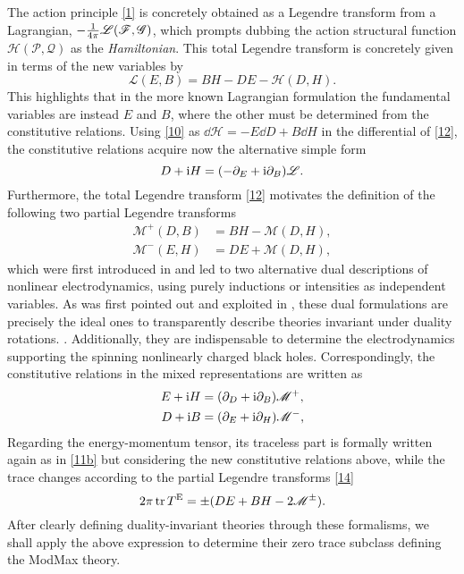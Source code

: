 The action principle \eqref{1} is concretely obtained as a Legendre transform from a Lagrangian, $-\frac{1}{4\pi }\mathscr{L}(\mathscr{F},\mathscr{G})$, which prompts dubbing the action structural function $\mathscr{H}(\mathscr{P},\mathscr{Q})$ as the \textit{Hamiltonian}. This total Legendre transform is concretely given in terms of the new variables by
\begin{equation}\label{12}
  \mathscr{L}(E,B)=BH-DE-\mathscr{H}(D,H).
\end{equation}
This highlights that in the more known Lagrangian formulation the fundamental variables are instead $E$ and $B$, where the other must be determined from the constitutive relations. Using \eqref{10} as $\dd\mathscr{H}=-E\dd D+B\dd H$ in the differential of \eqref{12}, the constitutive relations acquire now the alternative simple form
\begin{equation}\label{13}
  D+\mathrm{i} H=(-\partial_E+\mathrm{i} \partial_B)\mathscr{L}.
\end{equation}
Furthermore, the total Legendre transform \eqref{12} motivates the definition of the following two partial Legendre transforms
\begin{subequations}\label{14}
	\begin{align}
  \mathscr{M}^+(D,B)&=BH-\mathscr{M}(D,H),\\
  \mathscr{M}^-(E,H)&=DE+\mathscr{M}(D,H),
\end{align}
\end{subequations}
which were first introduced in \cite{Salazar:1987ap} and led to two alternative dual descriptions of nonlinear electrodynamics, using purely inductions or intensities as independent variables. As was first pointed out and exploited in \cite{Salazar:1987ap}, these dual formulations are precisely the ideal ones to transparently describe theories invariant under duality rotations. . Additionally, they are indispensable to determine the electrodynamics supporting the spinning nonlinearly charged black holes. Correspondingly, the constitutive relations in the mixed representations are written as
\begin{subequations}\label{15}
	\begin{align}
  E+\mathrm{i} H&=(\partial_D +\mathrm{i} \partial_B)\mathscr{M}^+,\\
  D+\mathrm{i} B&=(\partial_E+\mathrm{i} \partial_H)\mathscr{M}^-,
\end{align}
\end{subequations}
Regarding the energy-momentum tensor, its traceless part is formally written again as in \eqref{11b} but considering the new constitutive relations above, while the trace changes according to the partial Legendre transforms \eqref{14}
\begin{equation}\label{16}
  2\pi \tr T^{\rm E}=\pm (DE+BH-2\mathscr{M}^{\pm }).
\end{equation}
After clearly defining duality-invariant theories through these formalisms, we shall apply the above expression to determine their zero trace subclass defining the ModMax theory.

